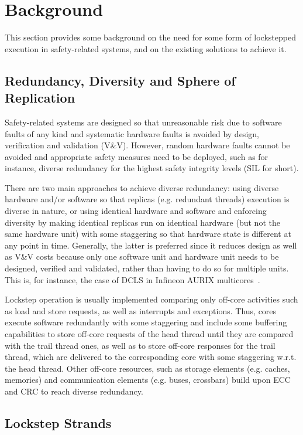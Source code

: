 \section{Background}
\label{sec:back}

This section provides some background on the need for some form of lockstepped execution in safety-related systems, and on the existing solutions to achieve it.


\subsection{Redundancy, Diversity and Sphere of Replication}
Safety-related systems are designed so that unreasonable risk due to software faults of any kind and systematic hardware faults is avoided by design, verification and validation (V\&V). However, random hardware faults cannot be avoided and appropriate safety measures need to be deployed, such as for instance, diverse redundancy for the highest safety integrity levels (SIL for short).

There are two main approaches to achieve diverse redundancy: using diverse hardware and/or software so that replicas (e.g. redundant threads) execution is diverse in nature, or using identical hardware and software and enforcing diversity by making identical replicas run on identical hardware (but not the same hardware unit) with some staggering so that hardware state is different at any point in time. Generally, the latter is preferred since it reduces design as well as V\&V costs because only one software unit and hardware unit needs to be designed, verified and validated, rather than having to do so for multiple units. This is, for instance, the case of DCLS in Infineon AURIX multicores~\cite{infineon_aurix}.

Lockstep operation is usually implemented 
comparing only off-core activities such as load and store requests, as well as interrupts and exceptions. Thus, cores execute software redundantly with some staggering and include some buffering capabilities to store off-core requests of the head thread until they are compared with the trail thread ones, as well as to store off-core responses for the trail thread, which are delivered to the corresponding core with some staggering w.r.t. the head thread.
Other off-core resources, such as storage elements (e.g. caches, memories) and communication elements (e.g. buses, crossbars) build upon ECC and CRC to reach diverse redundancy.


\subsection{Lockstep Strands}

